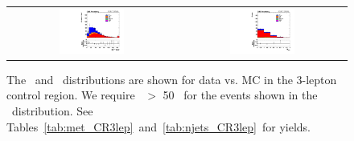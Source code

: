 \begin{figure}[!h]
\begin{center}
\begin{tabular}{cc}
\includegraphics[width=0.4\textwidth]{bkgd/figs/h_metall_ll_signalregion_CR3lep_passtrig.pdf} &
\includegraphics[width=0.4\textwidth]{bkgd/figs/h_njtm50_ll_signalregion_CR3lep_passtrig.pdf} \\
\end{tabular}
\caption{The \MET\ and \nj\ distributions are shown for data vs. MC in the 3-lepton control region.
  We require \MET\ $>$ 50 \gev\ for the events shown in the \nj\ distribution.
See Tables~\ref{tab:met_CR3lep}~and~\ref{tab:njets_CR3lep}~for yields.
\label{fig:bkg_CR3lep}
}
\end{center}
\end{figure}



